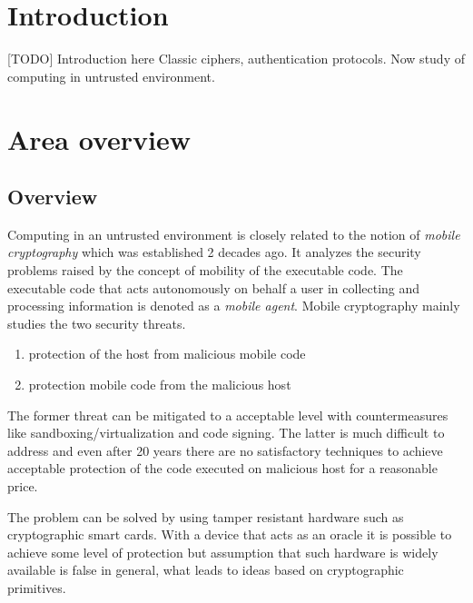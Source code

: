 \documentclass[11pt,oneside,final]{fithesis2}
\begin{document}

\chapter{Introduction}
    [TODO] Introduction here
    Classic ciphers, authentication protocols. Now study of computing in untrusted environment.

\chapter{Area overview}\label{sec:theory}
    
    \section{Overview}
    Computing in an untrusted environment is closely related to the notion of \emph{mobile cryptography} \citep{mobile_cryptography} which was established 2 decades ago.
    It analyzes the security problems raised by the concept of mobility of the executable code. The executable code that acts autonomously on behalf a user in collecting 
    and processing information is denoted as a \emph{mobile agent}. Mobile cryptography mainly studies the two security threats.
    \begin{enumerate}
     \item protection of the host from malicious mobile code
     \item protection mobile code from the malicious host
    \end{enumerate}
    
    The former threat can be mitigated to a acceptable level with countermeasures like sandboxing/virtualization and code signing. The latter is much difficult to address 
    and even after 20 years there are no satisfactory techniques to achieve acceptable protection of the code executed on malicious host for a reasonable price.
    
    The problem can be solved by using tamper resistant hardware such as cryptographic smart cards. With a device that acts as an oracle it is possible to achieve some
    level of protection but assumption that such hardware is widely available is false in general, what leads to ideas based on cryptographic primitives.
    
\end{document}
